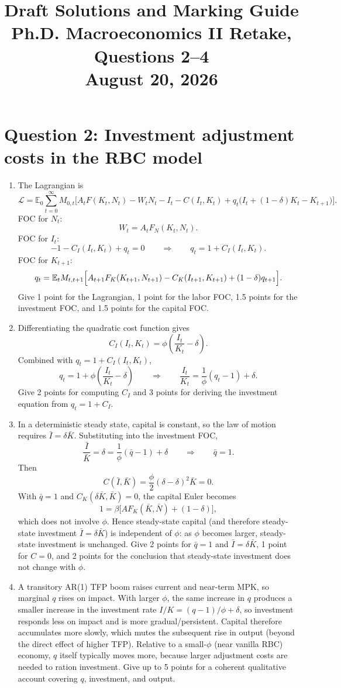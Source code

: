 \documentclass[11pt]{article}
\title{Draft Solutions and Marking Guide\\
Ph.D. Macroeconomics II Retake, Questions 2--4\\
August 20, 2026}
\author{}
\date{}
\newcommand{\ben}{\begin{enumerate}}
\newcommand{\een}{\end{enumerate}}
\begin{document}
\maketitle

\section*{Question 2: Investment adjustment costs in the RBC model}

\ben
\item The Lagrangian is
\[
\mathcal{L}=\mathbb{E}_0\sum_{t=0}^{\infty} M_{0,t}\Big[
A_t F(K_t,N_t)-W_t N_t-I_t-C(I_t,K_t)
+q_t\bigl(I_t+(1-\delta)K_t-K_{t+1}\bigr)
\Big].
\]
FOC for $N_t$:
\[
W_t=A_t F_N(K_t,N_t).
\]
FOC for $I_t$:
\[
-1-C_I(I_t,K_t)+q_t=0
\qquad\Rightarrow\qquad
q_t=1+C_I(I_t,K_t).
\]
FOC for $K_{t+1}$:
\[
q_t=\mathbb{E}_t M_{t,t+1}\Bigl[
A_{t+1}F_K(K_{t+1},N_{t+1})-C_K(I_{t+1},K_{t+1})+(1-\delta)q_{t+1}
\Bigr].
\]
Give 1 point for the Lagrangian, 1 point for the labor FOC, 1.5 points for the investment FOC, and 1.5 points for the capital FOC.

\item Differentiating the quadratic cost function gives
\[
C_I(I_t,K_t)=\phi\left(\frac{I_t}{K_t}-\delta\right).
\]
Combined with $q_t=1+C_I(I_t,K_t)$,
\[
q_t=1+\phi\left(\frac{I_t}{K_t}-\delta\right)
\qquad\Rightarrow\qquad
\frac{I_t}{K_t}=\frac{1}{\phi}(q_t-1)+\delta.
\]
Give 2 points for computing $C_I$ and 3 points for deriving the investment equation from $q_t=1+C_I$.

\item In a deterministic steady state, capital is constant, so the law of motion requires $\bar I=\delta\bar K$. Substituting into the investment FOC,
\[
\frac{\bar I}{\bar K}=\delta=\frac{1}{\phi}(\bar q-1)+\delta
\qquad\Rightarrow\qquad
\bar q=1.
\]
Then
\[
C(\bar I,\bar K)=\frac{\phi}{2}\left(\delta-\delta\right)^2\bar K=0.
\]
With $\bar q=1$ and $C_K(\delta\bar K,\bar K)=0$, the capital Euler becomes
\[
1=\beta\bigl[A F_K(\bar K,\bar N)+(1-\delta)\bigr],
\]
which does not involve $\phi$. Hence steady-state capital (and therefore steady-state investment $\bar I=\delta\bar K$) is independent of $\phi$: as $\phi$ becomes larger, steady-state investment is unchanged. Give 2 points for $\bar q=1$ and $\bar I=\delta\bar K$, 1 point for $C=0$, and 2 points for the conclusion that steady-state investment does not change with $\phi$.

\item A transitory AR(1) TFP boom raises current and near-term MPK, so marginal $q$ rises on impact. With larger $\phi$, the same increase in $q$ produces a smaller increase in the investment rate $I/K=(q-1)/\phi+\delta$, so investment responds less on impact and is more gradual/persistent. Capital therefore accumulates more slowly, which mutes the subsequent rise in output (beyond the direct effect of higher TFP). Relative to a small-$\phi$ (near vanilla RBC) economy, $q$ itself typically moves more, because larger adjustment costs are needed to ration investment. Give up to 5 points for a coherent qualitative account covering $q$, investment, and output.
\een
\end{document}
